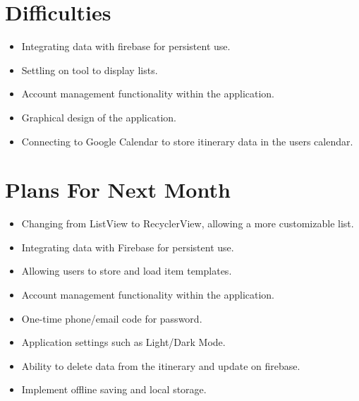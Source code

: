 \documentclass[12pt]{article}
\begin{document}
	\section*{Difficulties}
	\begin{itemize}
		\item Integrating data with firebase for persistent use.
		\item Settling on tool to display lists.
		\item Account management functionality within the application.
		\item Graphical design of the application.
		\item Connecting to Google Calendar to store itinerary data in the users calendar.
	\end{itemize}
	
	\section*{Plans For Next Month}
	\begin{itemize}
		\item Changing from ListView to RecyclerView, allowing a more customizable list.
		\item Integrating data with Firebase for persistent use.
		\item Allowing users to store and load item templates.
		\item Account management functionality within the application.
		\item One-time phone/email code for password.
		\item Application settings such as Light/Dark Mode.

		\item Ability to delete data from the itinerary and update on firebase.
		\item Implement offline saving and local storage.
	\end{itemize}
\end{document}
